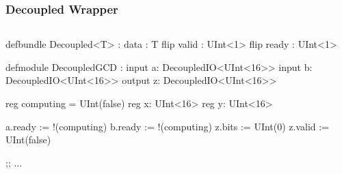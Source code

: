 \documentclass[xcolor=pdflatex,dvipsnames,table]{beamer}
\begin{document}
\begin{frame}[fragile]
\frametitle{Decoupled Wrapper}

\begin{columns}


\begin{footnotesize}
\begin{stanza}
defbundle Decoupled<T> :
  data : T
  flip valid : UInt<1>
  flip ready : UInt<1>

defmodule DecoupledGCD :
   input  a: DecoupledIO<UInt<16>>
   input  b: DecoupledIO<UInt<16>>
   output z: DecoupledIO<UInt<16>>

   reg computing = UInt(false)
   reg x: UInt<16>
   reg y: UInt<16>

   a.ready := !(computing)
   b.ready := !(computing)
   z.bits  := UInt(0)
   z.valid := UInt(false)

   ;; ...
\end{stanza}
\end{footnotesize}



\end{columns}
\end{frame}
\end{document}
